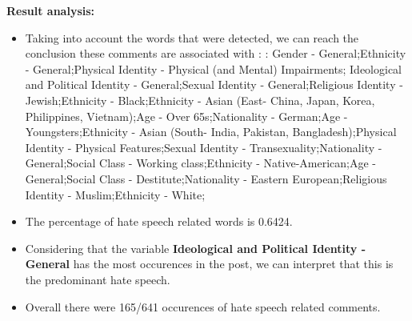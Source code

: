 \documentclass[11pt]{article}
\begin{document}
\textbf{\Large Result analysis:}

\begin{itemize}\item Taking into account the words that were detected, we can reach the conclusion these comments are associated with : : Gender - General;Ethnicity - General;Physical Identity - Physical (and Mental) Impairments; Ideological and Political Identity - General;Sexual Identity - General;Religious Identity - Jewish;Ethnicity - Black;Ethnicity - Asian (East- China, Japan, Korea, Philippines, Vietnam);Age - Over 65s;Nationality - German;Age - Youngsters;Ethnicity - Asian (South- India, Pakistan, Bangladesh);Physical Identity - Physical Features;Sexual Identity - Transexuality;Nationality - General;Social Class - Working class;Ethnicity - Native-American;Age - General;Social Class - Destitute;Nationality - Eastern European;Religious Identity - Muslim;Ethnicity - White;%

\item The percentage of hate speech related words is 0.6424.

\item Considering that the variable \textbf{ Ideological and Political Identity - General} has the most occurences in the post, we can interpret that this is the predominant hate speech.

\item Overall there were 165/641 occurences of hate speech related comments.\end{itemize}
\end{document}
